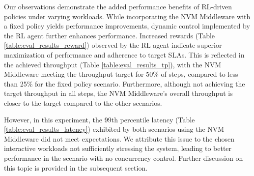 Our observations demonstrate the added performance benefits of RL-driven policies under varying workloads. While incorporating the NVM Middleware with a fixed policy yields performance improvements, dynamic control implemented by the RL agent further enhances performance. Increased rewards (Table \ref{table:eval_results_reward}) observed by the RL agent indicate superior maximization of performance and adherence to target SLAs. This is reflected in the achieved throughput (Table \ref{table:eval_results_tp}), with the NVM Middleware meeting the throughput target for 50\% of steps, compared to less than 25\% for the fixed policy scenario. Furthermore, although not achieving the target throughput in all steps, the NVM Middleware's overall throughput is closer to the target compared to the other scenarios.

However, in this experiment, the 99th percentile latency (Table \ref{table:eval_results_latency}) exhibited by both scenarios using the NVM Middleware did not meet expectations. We attribute this issue to the chosen interactive workloads not sufficiently stressing the system, leading to better performance in the scenario with no concurrency control. Further discussion on this topic is provided in the subsequent section.








